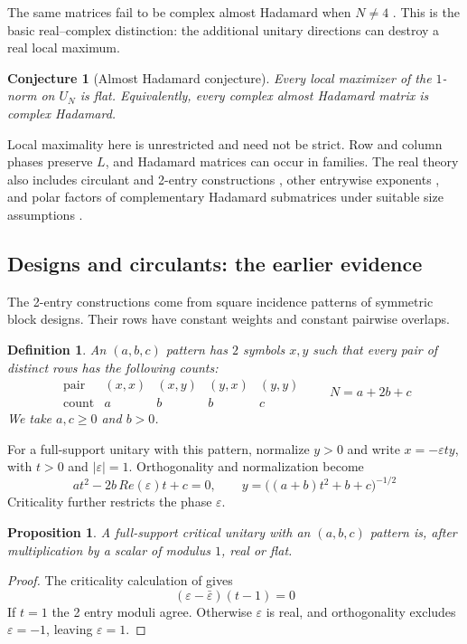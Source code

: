 \documentclass[11pt,a4paper]{article}
\newtheorem{prop}[thm]{Proposition}
\newtheorem{defn}[thm]{Definition}
\newtheorem{conj}[thm]{Conjecture}
\begin{document}
The same matrices fail to be complex almost Hadamard when $N\ne4$
\cite[Theorem 4.7]{BN}. This is the basic real--complex distinction:
the additional unitary directions can destroy a real local maximum.

\begin{conj}[Almost Hadamard conjecture]\label{ahc}
Every local maximizer of the $1$-norm on $U_N$ is flat. Equivalently, every
complex almost Hadamard matrix is complex Hadamard.
\end{conj}

Local maximality here is unrestricted and need not be strict. Row and
column phases preserve $L$, and Hadamard matrices can occur in families.
The real theory also includes circulant and 2-entry constructions
\cite{BNZ}, other entrywise exponents \cite{BNp}, and polar factors of
complementary Hadamard submatrices under suitable size assumptions
\cite{BNS}.

\subsection{Designs and circulants: the earlier evidence}
The 2-entry constructions come from square incidence patterns of
symmetric block designs. Their rows have constant weights and constant
pairwise overlaps.

\begin{defn}
An $(a,b,c)$ pattern has $2$ symbols $x,y$ such that every pair of
distinct rows has the following counts:
\[
 \begin{array}{c|cccc}
 \text{pair}&(x,x)&(x,y)&(y,x)&(y,y)\\
 \hline
 \text{count}&a&b&b&c
 \end{array}
 \qquad N=a+2b+c
\]
We take $a,c\ge0$ and $b>0$.
\end{defn}

For a full-support unitary with this pattern, normalize $y>0$ and write
$x=-\varepsilon t y$, with $t>0$ and $|\varepsilon|=1$.
Orthogonality and normalization become
\[
 at^2-2b\,Re(\varepsilon)t+c=0,\qquad
 y=\big((a+b)t^2+b+c\big)^{-1/2}
\]
Criticality further restricts the phase $\varepsilon$.

\begin{prop}
A full-support critical unitary with an $(a,b,c)$ pattern is, after
multiplication by a scalar of modulus $1$, real or flat.
\end{prop}
\begin{proof}
The criticality calculation of \cite[Theorem 5.2]{BN} gives
\[
 (\varepsilon-\bar\varepsilon)(t-1)=0
\]
If $t=1$ the 2 entry moduli agree. Otherwise $\varepsilon$ is real,
and orthogonality excludes $\varepsilon=-1$, leaving $\varepsilon=1$.
\end{proof}
\end{document}
